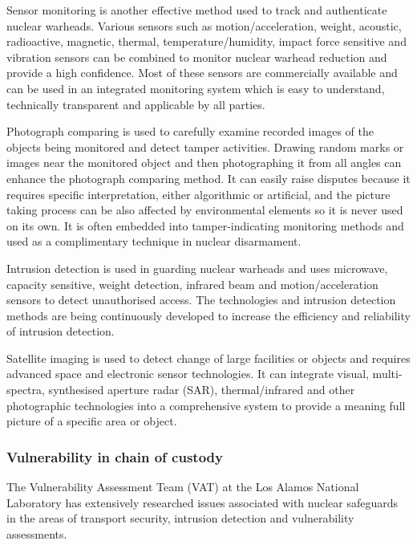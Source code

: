 \documentclass[twoside,titlepage,11pt,twocolumn,a4paper]{article}
\begin{document}
Sensor monitoring is another effective method used to track and
authenticate nuclear warheads.  Various sensors such as
motion/acceleration, weight, acoustic, radioactive, magnetic, thermal,
temperature/humidity, impact force sensitive and vibration sensors can
be combined to monitor nuclear warhead reduction and provide a high
confidence. Most of these sensors are commercially available and can
be used in an integrated monitoring system which is easy to
understand, technically transparent and applicable by all
parties. \citep{wuwen2004}

Photograph comparing is used to carefully examine recorded images of
the objects being monitored and detect tamper activities. Drawing
random marks or images near the monitored object and then
photographing it from all angles can enhance the photograph comparing
method. It can easily raise disputes because it requires specific
interpretation, either algorithmic or artificial, and the picture
taking process can be also affected by environmental elements so it is
never used on its own. It is often embedded into tamper-indicating
monitoring methods and used as a complimentary technique in nuclear
disarmament. \citep{wuwen2004}

Intrusion detection is used in guarding nuclear warheads and uses
microwave, capacity sensitive, weight detection, infrared beam and
motion/acceleration sensors to detect unauthorised access. The
technologies and intrusion detection methods are being continuously
developed to increase the efficiency and reliability of intrusion
detection. \citep{wuwen2004}

Satellite imaging is used to detect change of large facilities or
objects and requires advanced space and electronic sensor
technologies. It can integrate visual, multi-spectra, synthesised
aperture radar (SAR), thermal/infrared and other photographic
technologies into a comprehensive system to provide a meaning full
picture of a specific area or object. \citep{wuwen2004}

\subsubsection{Vulnerability in chain of custody}
The Vulnerability Assessment Team (VAT) at the Los Alamos National
Laboratory has extensively researched issues associated with nuclear
safeguards in the areas of transport security, intrusion detection and
vulnerability assessments. \citep{nuclearSafeguardsAndSec2005}
\end{document}
